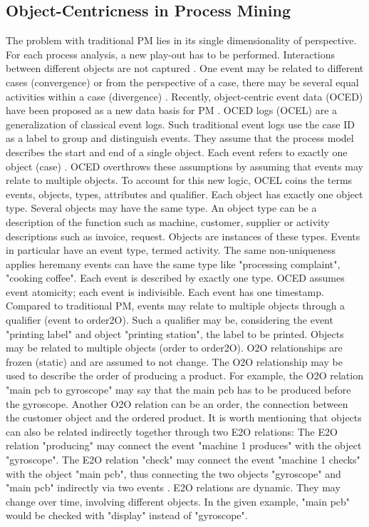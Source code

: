 \subsection{Object-Centricness in Process Mining}
\label{sec:object-centric-event-logs}

The problem with traditional PM lies in its single dimensionality of perspective. For each process analysis, a new play-out has to be performed. Interactions between different objects are not captured \autocite{van2023object}. One event may be related to different cases (convergence) or from the perspective of a case, there may be several equal activities within a case (divergence) \autocite{van2019object}.
Recently, object-centric event data (OCED) have been proposed as a new data basis for PM \autocite{van2019object}. OCED logs (OCEL) are a generalization of classical event logs. Such traditional event logs use the case ID as a label to group and distinguish events. They assume that the process model describes the start and end of a single object. Each event refers to exactly one object (case) \autocite{van2023object}. OCED overthrows these assumptions by assuming that events may relate to multiple objects. To account for this new logic, OCEL coins the terms events, objects, types, attributes and qualifier. Each object has exactly one object type. Several objects may have the same type. An object type can be a description of the function such as machine, customer, supplier or activity descriptions such as invoice, request. Objects are instances of these types. Events in particular have an event type, termed activity. The same non-uniqueness applies here\textemdash many events can have the same type like "processing complaint", "cooking coffee". Each event is described by exactly one type. OCED assumes event atomicity; each event is indivisible. Each event has one timestamp. Compared to traditional PM, events may relate to multiple objects through a qualifier (event to order\textemdashE2O). Such a qualifier may be, considering the event "printing label" and object "printing station", the label to be printed. Objects may be related to multiple objects (order to order\textemdashO2O). O2O relationships are frozen (static) and are assumed to not change. The O2O relationship may be used to describe the order of producing a product. For example, the O2O relation "main pcb to gyroscope" may say that the main pcb has to be produced before the gyroscope. Another O2O relation can be an order, the connection between the customer object and the ordered product. It is worth mentioning that objects can also be related indirectly together through two E2O relations: The E2O relation "producing" may connect the event "machine 1 produces" with the object "gyroscope". The E2O relation "check" may connect the event "machine 1 checks" with the object "main pcb", thus connecting the two objects "gyroscope" and "main pcb" indirectly via two events \autocite{van2019object}. E2O relations are dynamic. They may change over time, involving different objects. In the given example, "main pcb" would be checked with "display" instead of "gyroscope".

